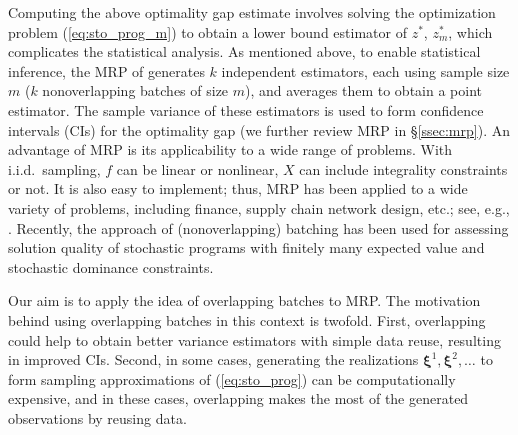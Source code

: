 \documentclass[12pt]{article}
\newcommand{\X}{X}
\newcommand{\xit}{\boldsymbol{\xi}}
\newcommand{\zs}{z^*}
\begin{document}
Computing the above optimality gap estimate involves solving the optimization problem (\ref{eq:sto_prog_m}) to obtain a lower bound estimator of $\zs$, $\zs_m$, which complicates the statistical analysis. 
As mentioned above, to enable statistical inference, the MRP of \citet{Mak1999} generates $k$ independent estimators, each using sample size $m$ ($k$ nonoverlapping batches of size $m$), and averages them to obtain a point estimator.  
The sample variance of these estimators is used to form confidence intervals (CIs) for the optimality gap (we further review MRP in \S \ref{ssec:mrp}).  
An advantage of MRP is its applicability to a wide range of problems.  
With i.i.d.\ sampling, $f$ can be linear or nonlinear, $\X$ can include integrality constraints or not.  
It is also easy to implement; thus, MRP has been applied to a wide variety of problems, including finance, supply chain network design, etc.; see, e.g., \cite{bertocchi_etal_99,janjarassuk_linderoth_08,santoso_ahmed_etal_05}.  
Recently, the approach of (nonoverlapping) batching has been used for assessing solution quality of stochastic programs with finitely many expected value \citep{wang_ahmed_08} and stochastic dominance \citep{hu2010sample} constraints.
 


Our aim is to apply the idea of overlapping batches to MRP.  
The motivation behind using overlapping batches in this context is twofold. 
First, overlapping could help to obtain better variance estimators with simple data reuse, resulting in improved CIs.
Second, in some cases, generating the realizations $\xit^1, \xit^2, \dots$ to form sampling approximations of (\ref{eq:sto_prog}) can be computationally expensive, and in these cases, overlapping makes the most of the generated observations by reusing data. 
\end{document}
